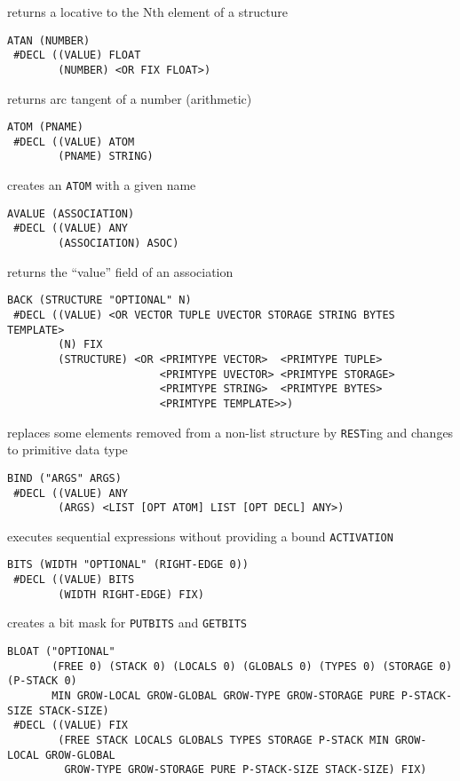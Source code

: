 \documentclass[a4paper]{scrbook}
\begin{document}
returns a locative to the Nth element of a structure

\begin{verbatim}
ATAN (NUMBER)
 #DECL ((VALUE) FLOAT
        (NUMBER) <OR FIX FLOAT>)
\end{verbatim}

returns arc tangent of a number (arithmetic)

\begin{verbatim}
ATOM (PNAME)
 #DECL ((VALUE) ATOM
        (PNAME) STRING)
\end{verbatim}

creates an \texttt{ATOM} with a given name

\begin{verbatim}
AVALUE (ASSOCIATION)
 #DECL ((VALUE) ANY
        (ASSOCIATION) ASOC)
\end{verbatim}

returns the ``value'' field of an association

\begin{verbatim}
BACK (STRUCTURE "OPTIONAL" N)
 #DECL ((VALUE) <OR VECTOR TUPLE UVECTOR STORAGE STRING BYTES TEMPLATE>
        (N) FIX
        (STRUCTURE) <OR <PRIMTYPE VECTOR>  <PRIMTYPE TUPLE>
                        <PRIMTYPE UVECTOR> <PRIMTYPE STORAGE>
                        <PRIMTYPE STRING>  <PRIMTYPE BYTES>
                        <PRIMTYPE TEMPLATE>>)
\end{verbatim}

replaces some elements removed from a non-list structure by \texttt{REST}ing and changes to primitive data type

\begin{verbatim}
BIND ("ARGS" ARGS)
 #DECL ((VALUE) ANY
        (ARGS) <LIST [OPT ATOM] LIST [OPT DECL] ANY>)
\end{verbatim}

executes sequential expressions without providing a bound \texttt{ACTIVATION}

\begin{verbatim}
BITS (WIDTH "OPTIONAL" (RIGHT-EDGE 0))
 #DECL ((VALUE) BITS
        (WIDTH RIGHT-EDGE) FIX)
\end{verbatim}

creates a bit mask for \texttt{PUTBITS} and \texttt{GETBITS}

\begin{verbatim}
BLOAT ("OPTIONAL"
       (FREE 0) (STACK 0) (LOCALS 0) (GLOBALS 0) (TYPES 0) (STORAGE 0) (P-STACK 0)
       MIN GROW-LOCAL GROW-GLOBAL GROW-TYPE GROW-STORAGE PURE P-STACK-SIZE STACK-SIZE)
 #DECL ((VALUE) FIX
        (FREE STACK LOCALS GLOBALS TYPES STORAGE P-STACK MIN GROW-LOCAL GROW-GLOBAL
         GROW-TYPE GROW-STORAGE PURE P-STACK-SIZE STACK-SIZE) FIX)
\end{verbatim}
\end{document}

